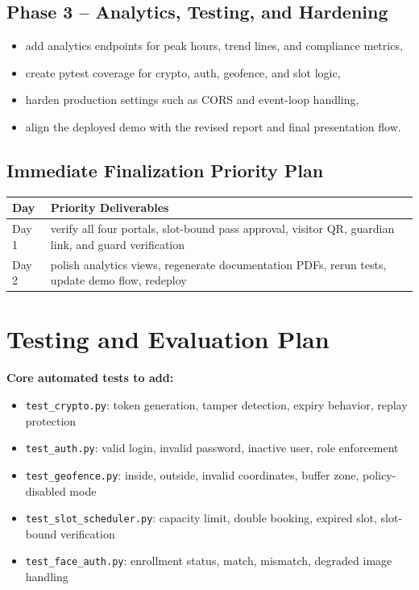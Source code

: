\documentclass[12pt,letterpaper]{article}
\begin{document}
\subsection{Phase 3 -- Analytics, Testing, and Hardening}
\begin{itemize}
    \item add analytics endpoints for peak hours, trend lines, and compliance metrics,
    \item create pytest coverage for crypto, auth, geofence, and slot logic,
    \item harden production settings such as CORS and event-loop handling,
    \item align the deployed demo with the revised report and final presentation flow.
\end{itemize}

\subsection{Immediate Finalization Priority Plan}
\begin{tabularx}{\textwidth}{@{}L{1.5cm}Y@{}}
\toprule
\textbf{Day} & \textbf{Priority Deliverables} \\
\midrule
Day 1 & verify all four portals, slot-bound pass approval, visitor QR, guardian link, and guard verification \\
Day 2 & polish analytics views, regenerate documentation PDFs, rerun tests, update demo flow, redeploy \\
\bottomrule
\end{tabularx}

\section{Testing and Evaluation Plan}

\textbf{Core automated tests to add:}
\begin{itemize}
    \item \texttt{test\_crypto.py}: token generation, tamper detection, expiry behavior, replay protection
    \item \texttt{test\_auth.py}: valid login, invalid password, inactive user, role enforcement
    \item \texttt{test\_geofence.py}: inside, outside, invalid coordinates, buffer zone, policy-disabled mode
    \item \texttt{test\_slot\_scheduler.py}: capacity limit, double booking, expired slot, slot-bound verification
    \item \texttt{test\_face\_auth.py}: enrollment status, match, mismatch, degraded image handling
\end{itemize}
\end{document}

